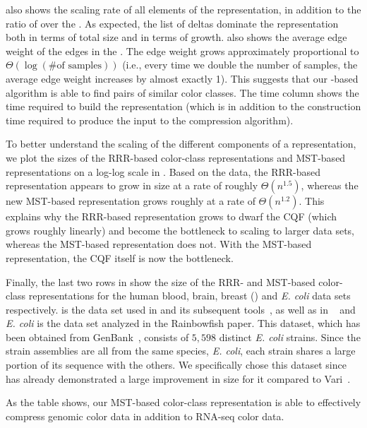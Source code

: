  also shows the scaling rate of all elements of
the \mst representation, in addition to the ratio of \mst over the
\cbv.  As expected, the list of deltas dominate the \mst
representation both in terms of total size and in terms of
growth.  also shows the average edge weight of
the edges in the \mst.  The edge weight grows approximately
proportional to $\Theta(\log(\text{\# of samples}))$ (i.e., every time
we double the number of samples, the average edge weight increases by
almost exactly 1). This suggests that our \dbg-based algorithm
is able to find pairs of similar color classes. The time column shows the time
required to build the \mst representation (which is in addition to the \prevsys
construction time required to produce the input to the \mst compression
algorithm).

To better understand the scaling of the different components of a
\cdbg representation, we plot the sizes of the RRR-based color-class
representations and MST-based representations on a log-log scale in
. Based on the data, the RRR-based
representation appears to grow in size at a rate of roughly
$\Theta(n^{1.5})$, whereas the new MST-based representation grows
roughly at a rate of $\Theta(n^{1.2})$. This explains why the
RRR-based representation grows to dwarf the CQF (which grows roughly
linearly) and become the bottleneck to scaling to larger data sets,
whereas the MST-based representation does not. With the MST-based
representation, the CQF itself is now the bottleneck.

Finally, the last two rows in  show the size of the RRR- and MST-based
color-class representations for the human blood, brain, breast (\bbb) and \textit{E. coli} data sets respectively.
\bbb is the data set used in \sbt and
its subsequent tools~\citep{Solomon2017Improved,Sun2017Allsome,seqothello},
as well as in \prevsys~\citep{mantis}
and \textit{E. coli} is the data set analyzed in the Rainbowfish paper.
This dataset, which has been obtained from
GenBank~\cite{o2015reference}, consists of $5,598$ distinct \emph{E. coli}
strains. Since the strain assemblies are all from the same species,
\emph{E. coli}, each strain shares a large portion of its sequence with the others.
We specifically chose this dataset since \rainbowfish has already
demonstrated a large improvement in size for it compared to
Vari~\citep{MuggliBoNo17}.

As the table shows, our MST-based
color-class representation is able to effectively compress genomic
color data in addition to RNA-seq color data.

